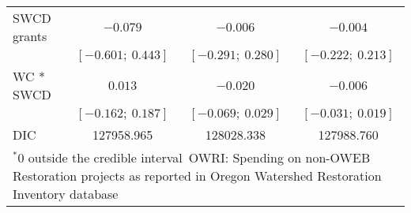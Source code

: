 \begin{table}
\begin{center}
\begin{tabular}{l c c c }
SWCD grants   & $-0.079$            & $-0.006$            & $-0.004$            \\
              & $[-0.601;\ 0.443]$  & $[-0.291;\ 0.280]$  & $[-0.222;\ 0.213]$  \\
WC * SWCD     & $0.013$             & $-0.020$            & $-0.006$            \\
              & $[-0.162;\ 0.187]$  & $[-0.069;\ 0.029]$  & $[-0.031;\ 0.019]$  \\
\hline
DIC           & 127958.965          & 128028.338          & 127988.760          \\
\hline
\multicolumn{4}{l}{\scriptsize{$^* 0$ outside the credible interval\
       OWRI: Spending on non-OWEB Restoration projects as reported in Oregon Watershed Restoration Inventory database}}
\end{tabular}
\label{table:basemods}
\end{center}
\end{table}
